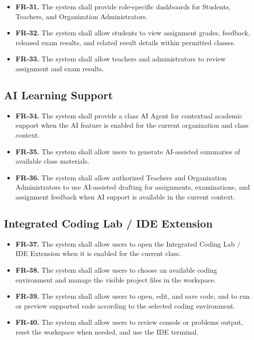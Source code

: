 \begin{itemize}
  \item \textbf{FR-31.} The system shall provide role-specific dashboards for
    Students, Teachers, and Organization Administrators.
  \item \textbf{FR-32.} The system shall allow students to view assignment
    grades, feedback, released exam results, and related result details within
    permitted classes.
  \item \textbf{FR-33.} The system shall allow teachers and administrators to review assignment and exam results.
\end{itemize}

\subsection*{AI Learning Support}

\begin{itemize}
  \item \textbf{FR-34.} The system shall provide a class AI Agent for
    contextual academic support when the AI feature is enabled for the current
    organization and class context.
  \item \textbf{FR-35.} The system shall allow users to generate AI-assisted summaries of available class materials.
  \item \textbf{FR-36.} The system shall allow authorized Teachers and
    Organization Administrators to use AI-assisted drafting for assignments,
    examinations, and assignment feedback when AI support is available in the
    current context.
\end{itemize}

\subsection*{Integrated Coding Lab / IDE Extension}

\begin{itemize}
  \item \textbf{FR-37.} The system shall allow users to open the Integrated
    Coding Lab / IDE Extension when it is enabled for the current class.
  \item \textbf{FR-38.} The system shall allow users to choose an available
    coding environment and manage the visible project files in the workspace.
  \item \textbf{FR-39.} The system shall allow users to open, edit, and save
    code, and to run or preview supported code according to the selected coding
    environment.
  \item \textbf{FR-40.} The system shall allow users to review console or problems output, reset the workspace when needed, and use the IDE terminal.
\end{itemize}

